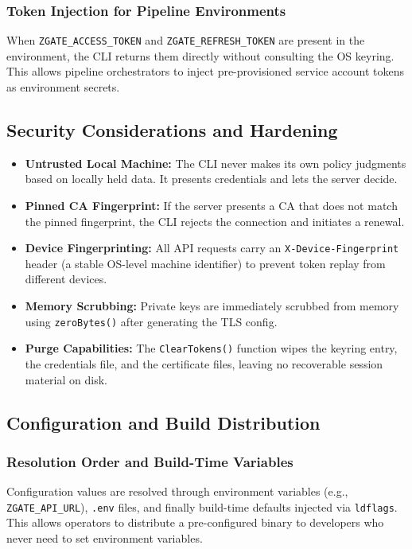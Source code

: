 \subsubsection{Token Injection for Pipeline Environments}
When \texttt{ZGATE\_ACCESS\_TOKEN} and \texttt{ZGATE\_REFRESH\_TOKEN} are present in the environment, the CLI returns them directly without consulting the OS keyring. This allows pipeline orchestrators to inject pre-provisioned service account tokens as environment secrets.

\subsection{Security Considerations and Hardening}

\begin{itemize}
    \item \textbf{Untrusted Local Machine:} The CLI never makes its own policy judgments based on locally held data. It presents credentials and lets the server decide.
    \item \textbf{Pinned CA Fingerprint:} If the server presents a CA that does not match the pinned fingerprint, the CLI rejects the connection and initiates a renewal.
    \item \textbf{Device Fingerprinting:} All API requests carry an \texttt{X-Device-Fingerprint} header (a stable OS-level machine identifier) to prevent token replay from different devices.
    \item \textbf{Memory Scrubbing:} Private keys are immediately scrubbed from memory using \texttt{zeroBytes()} after generating the TLS config.
    \item \textbf{Purge Capabilities:} The \texttt{ClearTokens()} function wipes the keyring entry, the credentials file, and the certificate files, leaving no recoverable session material on disk.
\end{itemize}

\subsection{Configuration and Build Distribution}

\subsubsection{Resolution Order and Build-Time Variables}
Configuration values are resolved through environment variables (e.g., \texttt{ZGATE\_API\_URL}), \texttt{.env} files, and finally build-time defaults injected via \texttt{ldflags}. This allows operators to distribute a pre-configured binary to developers who never need to set environment variables.

